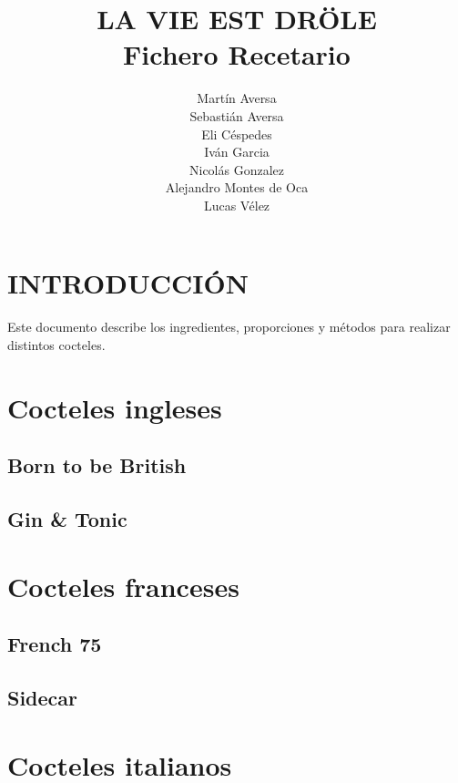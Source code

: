 \documentclass[a4paper]{spie}  %
\title{\uppercase{ {\fontsize{120}{120}\selectfont La vie est dr\"{o}le}} \\ 
\bigskip \bigskip \bigskip \bigskip
{\fontsize{40}{40}\selectfont Fichero Recetario}}
\author{Mart\'in Aversa \\
Sebasti\'an Aversa \\
Eli C\'espedes \\
Iv\'an Garcia \\
Nicol\'as Gonzalez \\
Alejandro Montes de Oca \\
Lucas V\'elez
\skiplinehalf}
\begin{document}
 
  \maketitle 

\section{INTRODUCCI\'ON}
\label{sec:intro}  %

Este documento describe los ingredientes, proporciones y m\'etodos para realizar distintos cocteles.
\bigskip
\bigskip
\tableofcontents

\newpage
\section{Cocteles ingleses}
\bigskip \bigskip \bigskip
\subsection{Born to be British}

\newpage

\newpage
\bigskip \bigskip \bigskip
\subsection{Gin \& Tonic}

\newpage

\newpage
\section{Cocteles franceses}
\bigskip \bigskip \bigskip
\subsection{French 75}

\newpage

\newpage
\bigskip \bigskip \bigskip
\subsection{Sidecar}

\newpage

\newpage
\section{Cocteles italianos}
\bigskip \bigskip \bigskip
\end{document}
